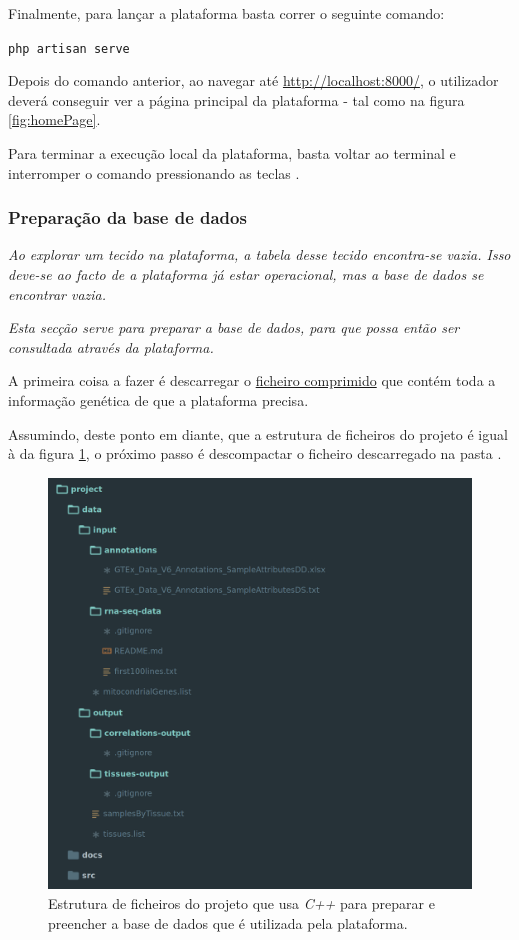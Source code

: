 \medskip

Finalmente, para lançar a plataforma basta correr o seguinte comando:

\smallskip

\texttt{php artisan serve}

\bigskip

Depois do comando anterior, ao navegar até \url{http://localhost:8000/}, o utilizador deverá conseguir ver a página principal da plataforma - tal como na figura \ref{fig:homePage}.

Para terminar a execução local da plataforma, basta voltar ao terminal e interromper o comando pressionando as teclas .


\subsubsection{Preparação da base de dados}

\textit{Ao explorar um tecido na plataforma, a tabela desse tecido encontra-se vazia. Isso deve-se ao facto de a plataforma já estar operacional, mas a base de dados se encontrar vazia.}

\textit{Esta secção serve para preparar a base de dados, para que possa então ser consultada através da plataforma.}

\bigskip

A primeira coisa a fazer é descarregar o \href{http://www.gtexportal.org/static/datasets/gtex_analysis_v6/rna_seq_data/GTEx_Analysis_v6_RNA-seq_RNA-SeQCv1.1.8_gene_rpkm.gct.gz}{ficheiro comprimido} que contém toda a informação genética de que a plataforma precisa.

Assumindo, deste ponto em diante, que a estrutura de ficheiros do projeto é igual à da figura \ref{fig:projectTree}, o próximo passo é descompactar o ficheiro descarregado na pasta .

\medskip

\begin{figure}[ht]
    \centering
    \includegraphics[width=0.7\linewidth]{res/project-tree.png}
    \caption{Estrutura de ficheiros do projeto que usa \textit{C++} para preparar e preencher a base de dados que é utilizada pela plataforma.}
    \label{fig:projectTree}
\end{figure}

